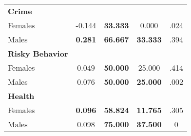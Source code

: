 \begin{tabular}{l c c c c}
\midrule
\textbf{Crime} & & & & \\
\quad Females &     -0.144 & \textbf{   33.333} &     0.000 & .024 \\
\quad Males &  \textbf{    0.281} & \textbf{   66.667} & \textbf{   33.333} & .394 \\
\midrule
\textbf{Risky Behavior} & & & & \\
\quad Females &      0.049 & \textbf{   50.000} &    25.000 & .414 \\
\quad Males &      0.076 & \textbf{   50.000} & \textbf{   25.000} & .002 \\
\midrule
\textbf{Health} & & & & \\
\quad Females &  \textbf{    0.096} & \textbf{   58.824} & \textbf{   11.765} & .305 \\
\quad Males &      0.098 & \textbf{   75.000} & \textbf{   37.500} & 0 \\
\bottomrule
\end{tabular}
